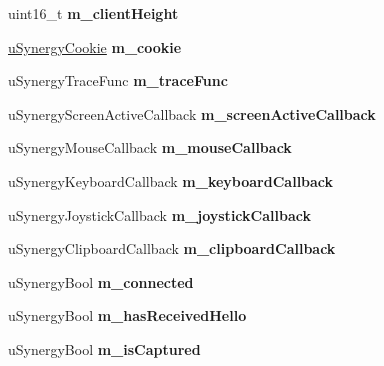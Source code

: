 \begin{DoxyCompactItemize}
uint16\+\_\+t {\bfseries m\+\_\+client\+Height}
\item 
\mbox{\label{structu_synergy_context_afb9e896ce56bfa44337e7df627884231}} 
\hyperlink{structu_synergy_cookie}{u\+Synergy\+Cookie} {\bfseries m\+\_\+cookie}
\item 
\mbox{\label{structu_synergy_context_aef2eeba30254b79ccf835971ffb4b49d}} 
u\+Synergy\+Trace\+Func {\bfseries m\+\_\+trace\+Func}
\item 
\mbox{\label{structu_synergy_context_a8bd70b3638fd7580f065d1c494ba5bbc}} 
u\+Synergy\+Screen\+Active\+Callback {\bfseries m\+\_\+screen\+Active\+Callback}
\item 
\mbox{\label{structu_synergy_context_a722bbcf10239a409884ef252b4e55e25}} 
u\+Synergy\+Mouse\+Callback {\bfseries m\+\_\+mouse\+Callback}
\item 
\mbox{\label{structu_synergy_context_afdea0c051827e8fa4896b3f60ab1cede}} 
u\+Synergy\+Keyboard\+Callback {\bfseries m\+\_\+keyboard\+Callback}
\item 
\mbox{\label{structu_synergy_context_a5759138908032a91e99ab7c6006b5087}} 
u\+Synergy\+Joystick\+Callback {\bfseries m\+\_\+joystick\+Callback}
\item 
\mbox{\label{structu_synergy_context_aa673042f3eb7111b29df8995b7f6713b}} 
u\+Synergy\+Clipboard\+Callback {\bfseries m\+\_\+clipboard\+Callback}
\item 
\mbox{\label{structu_synergy_context_af9e35e983122ec575b4367a24558a9c1}} 
u\+Synergy\+Bool {\bfseries m\+\_\+connected}
\item 
\mbox{\label{structu_synergy_context_ab8f465f95882ab15b7d9a1971297f918}} 
u\+Synergy\+Bool {\bfseries m\+\_\+has\+Received\+Hello}
\item 
\mbox{\label{structu_synergy_context_a31ed51685fd7f6e6d1500891848bc1a7}} 
u\+Synergy\+Bool {\bfseries m\+\_\+is\+Captured}

\end{DoxyCompactItemize}
